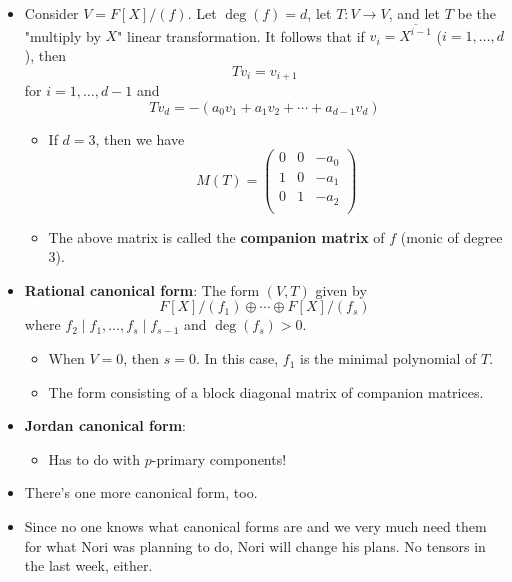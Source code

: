 \documentclass[../notes.tex]{subfiles}
\begin{document}
\begin{itemize}
    \item Consider $V=F[X]/(f)$. Let $\deg(f)=d$, let $T:V\to V$, and let $T$ be the "multiply by $X$" linear transformation. It follows that if $v_i=\overline{X^{i-1}}$ ($i=1,\dots,d$), then
    \begin{equation*}
        Tv_i = v_{i+1}
    \end{equation*}
    for $i=1,\dots,d-1$ and
    \begin{equation*}
        Tv_d = -(a_0v_1+a_1v_2+\cdots+a_{d-1}v_d)
    \end{equation*}
    \begin{itemize}
        \item If $d=3$, then we have
        \begin{equation*}
            M(T) =
            \begin{pmatrix}
                0 & 0 & -a_0\\
                1 & 0 & -a_1\\
                0 & 1 & -a_2\\
            \end{pmatrix}
        \end{equation*}
        \item The above matrix is called the \textbf{companion matrix} of $f$ (monic of degree 3).
    \end{itemize}
    \item \textbf{Rational canonical form}: The form $(V,T)$ given by
    \begin{equation*}
        F[X]/(f_1)\oplus\cdots\oplus F[X]/(f_s)
    \end{equation*}
    where $f_2\mid f_1,\dots,f_s\mid f_{s-1}$ and $\deg(f_s)>0$.
    \begin{itemize}
        \item When $V=0$, then $s=0$. In this case, $f_1$ is the minimal polynomial of $T$.
        \item The form consisting of a block diagonal matrix of companion matrices.
    \end{itemize}
    \item \textbf{Jordan canonical form}:
    \begin{itemize}
        \item Has to do with $p$-primary components!
    \end{itemize}
    \item There's one more canonical form, too.
    \item Since no one knows what canonical forms are and we very much need them for what Nori was planning to do, Nori will change his plans. No tensors in the last week, either.

\end{itemize}
\end{document}
